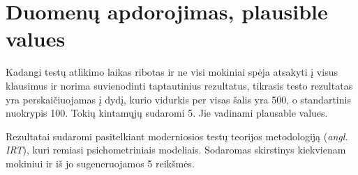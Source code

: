 \documentclass[12pt,a4paper]{article}
\begin{document}
\section{Duomenų apdorojimas, plausible values}
Kadangi testų atlikimo laikas ribotas ir ne visi mokiniai spėja atsakyti į visus klausimus ir norima suvienodinti taptautinius rezultatus, tikrasis testo rezultatas yra perskaičiuojamas į dydį, kurio vidurkis per visas šalis yra 500, o standartinis nuokrypis 100. Tokių kintamųjų sudaromi 5. Jie vadinami plausable values.

Rezultatai sudaromi pasitelkiant moderniosios testų teorijos metodologiją (\textit{angl. IRT}), kuri remiasi psichometriniais modeliais. Sodaromas skirstinys kiekvienam mokiniui ir iš jo sugeneruojamos 5 reikšmės.
\end{document}
